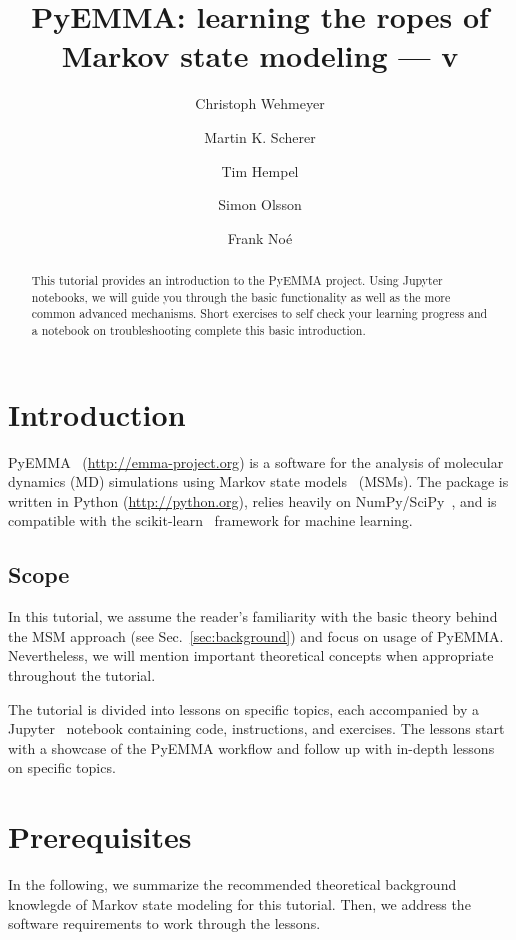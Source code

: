 \documentclass[9pt,tutorial]{livecoms}
\title{PyEMMA: learning the ropes of Markov state modeling --- v\versionnumber}
\author[1\authfn{1}*]{Christoph Wehmeyer}
\author[1\authfn{1}*]{Martin K. Scherer}
\author[1\authfn{1}*]{Tim Hempel}
\author[1*]{Simon Olsson}
\author[1*]{Frank Noé}
\affil[1]{Department of Mathematics and Computer Science, Freie Universität Berlin, Arnimallee 6, 14195 Berlin, Germany}
\begin{document}
\begin{frontmatter}
\maketitle

\begin{abstract}
This tutorial provides an introduction to the PyEMMA project. Using Jupyter notebooks, we will guide you through the basic functionality as well as the more common advanced mechanisms. Short exercises to self check your learning progress and a notebook on troubleshooting complete this basic introduction.
\end{abstract}

\end{frontmatter}

\section{Introduction}

PyEMMA~\cite{pyemma} (\url{http://emma-project.org}) is a software for the analysis of molecular dynamics (MD) simulations using Markov state models~\cite{schuette-msm,singhal-msm-naming} (MSMs). The package is written in Python (\url{http://python.org}), relies heavily on NumPy/SciPy~\cite{numpy,scipy}, and is compatible with the scikit-learn~\cite{sklearn} framework for machine learning.

\subsection{Scope}

In this tutorial, we assume the reader's familiarity with the basic theory behind the MSM approach (see Sec.~\ref{sec:background}) and focus on usage of PyEMMA. Nevertheless, we will mention important theoretical concepts when appropriate throughout the tutorial.

The tutorial is divided into lessons on specific topics, each accompanied by a Jupyter~\cite{jupyter} notebook containing code, instructions, and exercises. The lessons start with a showcase of the PyEMMA workflow and follow up with in-depth lessons on specific topics.

\section{Prerequisites}

In the following, we summarize the recommended theoretical background knowlegde of Markov state modeling for this tutorial. Then, we address the software requirements to work through the lessons.
\end{document}
